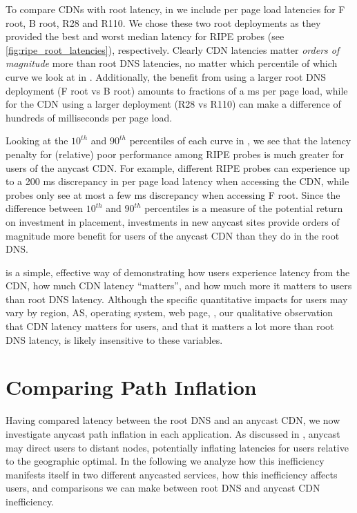 \documentclass[sigconf,letterpaper,nonacm,10pt,anonymous]{acmart}
\begin{document}
\label{sec:performance_comparison} To compare CDNs with root latency, in
 we include per page load latencies
for F root, B root, R28 and R110. We chose these two root deployments as
they provided the best and worst median latency for RIPE probes (see
\cref{fig:ripe_root_latencies}), respectively. Clearly CDN latencies
matter \emph{orders of magnitude} more than root DNS latencies, no
matter which percentile of which curve we look at in
. Additionally, the benefit from
using a larger root DNS deployment (F root vs B root) amounts to
fractions of a ms per page load, while for the CDN using a larger
deployment (R28 vs R110) can make a difference of hundreds of
milliseconds per page load.

Looking at the \(10^{th}\) and \(90^{th}\) percentiles of each curve in
, we see that the latency penalty for
(relative) poor performance among RIPE probes is much greater for users
of the anycast CDN. For example, different RIPE probes can experience up
to a 200 ms discrepancy in per page load latency when accessing the CDN,
while probes only see at most a few ms discrepancy when accessing F
root. Since the difference between \(10^{th}\) and \(90^{th}\)
percentiles is a measure of the potential return on investment in
\fe placement, investments in new anycast sites provide orders of
magnitude more benefit for users of the anycast CDN than they do in the
root DNS.

 is a simple, effective way of
demonstrating how users experience latency from the CDN, how much CDN
latency ``matters'', and how much more it matters to users than root DNS
latency. Although the specific quantitative impacts for users may vary
by region, AS, operating system, web page, \etc, our qualitative
observation that CDN latency matters for users, and that it matters a
lot more than root DNS latency, is likely insensitive to these
variables.

\section{Comparing Path Inflation}\label{comparing-path-inflation}

\label{sec:anycast_performance_difference} Having compared latency
between the root DNS and an anycast CDN, we now investigate anycast path
inflation in each application. As discussed in
, anycast may direct users to distant
nodes, potentially inflating latencies for users relative to the
geographic optimal. In the following we analyze how this inefficiency
manifests itself in two different anycasted services, how this
inefficiency affects users, and comparisons we can make between root DNS
and anycast CDN inefficiency.
\end{document}

